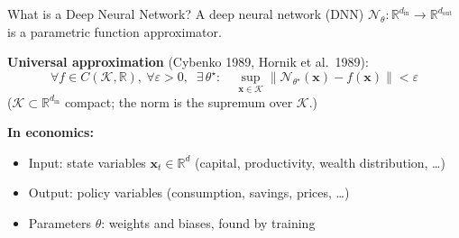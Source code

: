 \documentclass[aspectratio=169,11pt]{beamer}
\newcommand{\emphc}[1]{\textcolor{harvardcrimson}{#1}}
\newcommand{\x}{\bm{x}}
\newcommand{\R}{\mathbb{R}}
\begin{document}
\begin{frame}{What is a Deep Neural Network?}
A deep neural network (DNN) $\mathcal{N}_\theta : \R^{d_{\text{in}}} \to \R^{d_{\text{out}}}$ is a \emphc{parametric function approximator}.

\vspace{0.5em}
\textbf{Universal approximation} (Cybenko 1989, Hornik et al.\ 1989):
\[
\forall f \in C(\mathcal{K},\R),\ \forall\varepsilon > 0,\;\; \exists\, \theta^\star : \quad \sup_{\x\in\mathcal{K}}\bigl\|\mathcal{N}_{\theta^\star}(\x) - f(\x)\bigr\| < \varepsilon
\]
{\scriptsize ($\mathcal{K}\subset\R^{d_{\mathrm{in}}}$ compact; the norm is the supremum over $\mathcal{K}$.)}

\vspace{0.5em}
\textbf{In economics:}
\begin{itemize}
    \item \emphc{Input:} state variables $\x_t \in \R^{d}$ (capital, productivity, wealth distribution, \ldots)
    \item \emphc{Output:} policy variables (consumption, savings, prices, \ldots)
    \item \emphc{Parameters} $\theta$: weights and biases, found by \emphc{training}
\end{itemize}
\end{frame}
\end{document}
